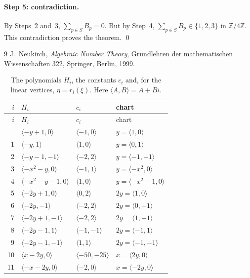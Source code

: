 \documentclass[11pt]{article}
\newcommand{\Z}{\mathbb{Z}}
\begin{document}
\paragraph{Step 5: contradiction.} By Steps~2 and~3, $\sum_{p\in S}B_p=0$. But by Step~4, $\sum_{p\in S}B_p\in\{1,2,3\}$ in $\Z/4\Z$. This contradiction proves the theorem.
\qed


\begin{thebibliography}{9}
 J.~Neukirch, \emph{Algebraic Number Theory}, Grundlehren der mathematischen Wissenschaften 322, Springer, Berlin, 1999.
\end{thebibliography}

\clearpage
\begingroup\small
\setlength{\LTcapwidth}{\textwidth}
\begin{longtable}{@{}rlll@{}}
\caption{The polynomials $H_i$, the constants $c_i$ and, for the linear vertices, $\eta=r_i(\xi)$. Here $\langle A,B\rangle=A+Bi$.}\label{tab:vert1}\\
\hline $i$ & $H_i$ & $c_i$ & chart\\\hline\endfirsthead\hline $i$ & $H_i$ & $c_i$ & chart\\\hline\endhead\hline\endfoot
0 & $\langle -y+1,0\rangle$ & $\langle -1,0\rangle$ & $y=\langle 1,0\rangle$\\
1 & $\langle -y,1\rangle$ & $\langle 1,0\rangle$ & $y=\langle 0,1\rangle$\\
2 & $\langle -y-1,-1\rangle$ & $\langle -2,2\rangle$ & $y=\langle -1,-1\rangle$\\
3 & $\langle -x^{2}-y,0\rangle$ & $\langle -1,1\rangle$ & $y=\langle -x^{2},0\rangle$\\
4 & $\langle -x^{2}-y-1,0\rangle$ & $\langle 1,0\rangle$ & $y=\langle -x^{2}-1,0\rangle$\\
5 & $\langle -2y+1,0\rangle$ & $\langle 0,2\rangle$ & $2y=\langle 1,0\rangle$\\
6 & $\langle -2y,-1\rangle$ & $\langle -2,2\rangle$ & $2y=\langle 0,-1\rangle$\\
7 & $\langle -2y+1,-1\rangle$ & $\langle -2,2\rangle$ & $2y=\langle 1,-1\rangle$\\
8 & $\langle -2y-1,1\rangle$ & $\langle -1,-1\rangle$ & $2y=\langle -1,1\rangle$\\
9 & $\langle -2y-1,-1\rangle$ & $\langle 1,1\rangle$ & $2y=\langle -1,-1\rangle$\\
10 & $\langle x-2y,0\rangle$ & $\langle -50,-25\rangle$ & $x=\langle 2y,0\rangle$\\
11 & $\langle -x-2y,0\rangle$ & $\langle -2,0\rangle$ & $x=\langle -2y,0\rangle$\\

\end{longtable}
\end{document}
